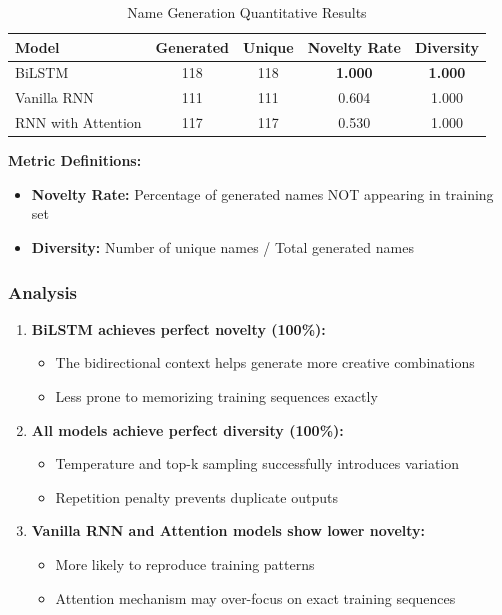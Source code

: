 \documentclass[12pt,a4paper]{article}
\begin{document}
\begin{table}[H]
\centering
\caption{Name Generation Quantitative Results}
\begin{tabular}{@{}lcccc@{}}
\toprule
\textbf{Model} & \textbf{Generated} & \textbf{Unique} & \textbf{Novelty Rate} & \textbf{Diversity} \\
\midrule
BiLSTM & 118 & 118 & \textbf{1.000} & \textbf{1.000} \\
Vanilla RNN & 111 & 111 & 0.604 & 1.000 \\
RNN with Attention & 117 & 117 & 0.530 & 1.000 \\
\bottomrule
\end{tabular}
\end{table}

\textbf{Metric Definitions:}
\begin{itemize}
    \item \textbf{Novelty Rate:} Percentage of generated names NOT appearing in training set
    \item \textbf{Diversity:} Number of unique names / Total generated names
\end{itemize}

\subsubsection{Analysis}

\begin{enumerate}
    \item \textbf{BiLSTM achieves perfect novelty (100\%):}
    \begin{itemize}
        \item The bidirectional context helps generate more creative combinations
        \item Less prone to memorizing training sequences exactly
    \end{itemize}

    \item \textbf{All models achieve perfect diversity (100\%):}
    \begin{itemize}
        \item Temperature and top-k sampling successfully introduces variation
        \item Repetition penalty prevents duplicate outputs
    \end{itemize}

    \item \textbf{Vanilla RNN and Attention models show lower novelty:}
    \begin{itemize}
        \item More likely to reproduce training patterns
        \item Attention mechanism may over-focus on exact training sequences
    \end{itemize}
\end{enumerate}
\end{document}
